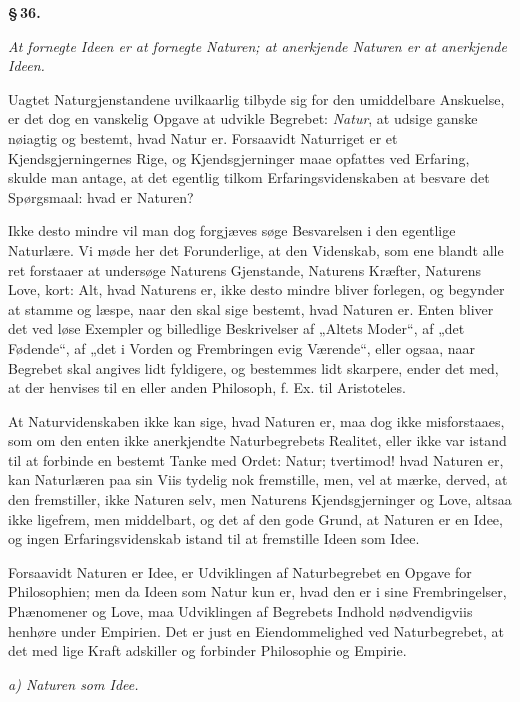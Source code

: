 \documentclass[12pt]{book}
\newcommand{\opage}[1]{\marginnote{\footnotesize\textit{[#1]}}}
\begin{document}
\begin{center}{\bfseries \S\,36.}\end{center}

\emph{At fornegte Ideen er at fornegte Naturen; at anerkjende Naturen er at anerkjende Ideen.}

Uagtet Naturgjenstandene uvilkaarlig tilbyde sig for den umiddelbare Anskuelse, er det dog en vanskelig
Opgave at udvikle Begrebet: \emph{Natur}, at udsige ganske nøiagtig og bestemt, hvad Natur er.
Forsaavidt Naturriget er et Kjendsgjerningernes Rige, og Kjendsgjerninger maae opfattes ved
\opage{191} Erfaring, skulde man antage, at det egentlig tilkom Erfaringsvidenskaben at besvare det Spørgsmaal:
hvad er Naturen?

Ikke desto mindre vil man dog forgjæves søge Besvarelsen i den egentlige Naturlære. Vi møde her det
Forunderlige, at den Videnskab, som ene blandt alle ret forstaaer at undersøge Naturens Gjenstande,
Naturens Kræfter, Naturens Love, kort: Alt, hvad Naturens er, ikke desto mindre bliver forlegen, og
begynder at stamme og læspe, naar den skal sige bestemt, hvad Naturen er. Enten bliver det ved løse
Exempler og billedlige Beskrivelser af „Altets Moder“, af „det Fødende“, af „det i Vorden og
Frembringen evig Værende“, eller ogsaa, naar Begrebet skal angives lidt fyldigere, og bestemmes lidt
skarpere, ender det med, at der henvises til en eller anden Philosoph, f. Ex. til Aristoteles.

At Naturvidenskaben ikke kan sige, hvad Naturen er, maa dog ikke misforstaaes, som om den enten ikke
anerkjendte Naturbegrebets Realitet, eller ikke var istand til at forbinde en bestemt Tanke med Ordet:
Natur; tvertimod! hvad Naturen er, kan Naturlæren paa sin Viis tydelig nok fremstille, men, vel at
mærke, derved, at den fremstiller, ikke Naturen selv, men Naturens Kjendsgjerninger og Love, altsaa
ikke ligefrem, men middelbart, og det af den gode Grund, at Naturen er en Idee, og ingen
Erfaringsvidenskab istand til at fremstille Ideen som Idee.

Forsaavidt Naturen er Idee, er Udviklingen af Naturbegrebet en Opgave for Philosophien; men da Ideen
som Natur kun er, hvad den er i sine Frembringelser, Phænomener og Love, maa Udviklingen af Begrebets
Indhold nødvendigviis henhøre under Empirien. Det er just en Eiendommelighed ved Naturbegrebet, at det
med lige Kraft adskiller og forbinder Philosophie og Empirie.
\opage{192} \begin{center}\emph{a) Naturen som Idee.}\end{center}
\end{document}
